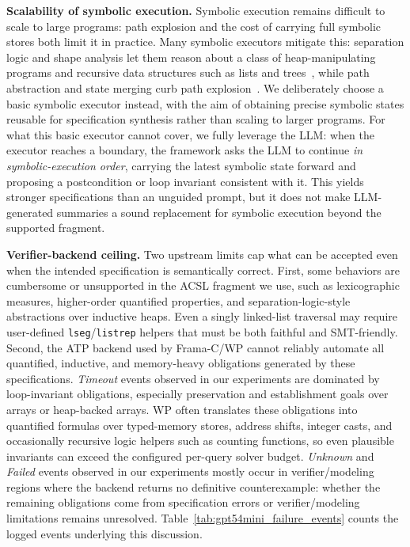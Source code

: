 \smallskip
\noindent\textbf{Scalability of symbolic execution.}
Symbolic execution remains difficult to scale to large programs: path explosion
and the cost of carrying full symbolic stores both limit it in practice. Many symbolic executors mitigate this: separation
logic and shape analysis let them reason about a class of heap-manipulating
programs and recursive data structures such as lists and
trees~\cite{calcagno2009compositional}, while path abstraction
and state merging curb path explosion~\cite{kuznetsov2012merging,avgerinos2014veritesting}.
We deliberately choose a basic symbolic executor instead, with the aim of
obtaining precise symbolic states reusable for specification synthesis rather
than scaling to larger programs. For what this basic executor cannot cover, we
fully leverage the LLM: when the executor reaches a boundary, the framework asks
the LLM to continue \emph{in symbolic-execution order}, carrying the latest
symbolic state forward and proposing a postcondition or loop invariant
consistent with it. This yields stronger specifications than an unguided prompt,
but it does not make LLM-generated summaries a sound replacement for symbolic
execution beyond the supported fragment.


\smallskip
\noindent\textbf{Verifier-backend ceiling.}
Two upstream limits cap what can be accepted even when the intended
specification is semantically correct. First, some behaviors are cumbersome or
unsupported in the ACSL fragment we use, such as lexicographic measures,
higher-order quantified properties, and separation-logic-style abstractions
over inductive heaps. Even a singly linked-list traversal may require
user-defined \texttt{lseg}/\texttt{listrep} helpers that must be both faithful
and SMT-friendly. Second, the ATP backend used by Frama-C/WP cannot reliably
automate all quantified, inductive, and memory-heavy obligations generated by
these specifications. 
\emph{Timeout} events observed in our experiments are dominated by loop-invariant obligations, especially
preservation and establishment goals over arrays or heap-backed arrays. 
WP often translates these obligations into
quantified formulas over typed-memory stores, address shifts, integer casts, and
occasionally recursive logic helpers such as counting functions, so even
plausible invariants can exceed the configured per-query solver budget.
\emph{Unknown} and \emph{Failed} events observed in our experiments mostly occur
in verifier/modeling regions where the backend returns no definitive
counterexample: whether the remaining obligations come from specification
errors or verifier/modeling limitations remains unresolved.
Table~\ref{tab:gpt54mini_failure_events} counts the logged events underlying
this discussion.

